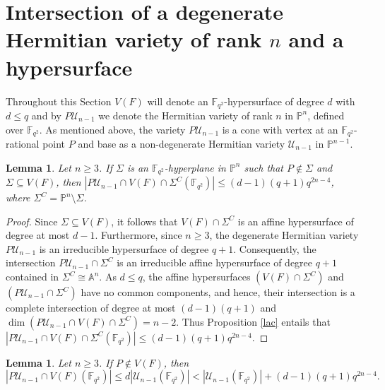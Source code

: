 \documentclass[10pt,a4paper,oneside]{amsproc}
\newtheorem{lemma}[theorem]{Lemma}
\newcommand{\Fqt}{\mathbb{F}_{q^2}}
\newcommand{\U}{\mathcal{U}}
\def\AA{{\mathbb A}}
\def\PP{{\mathbb P}}
\begin{document}
\section{Intersection of a degenerate Hermitian variety of rank $n$ and a hypersurface}\label{degenerate of rank n}
Throughout this Section $V(F)$ will denote an $\Fqt$-hypersurface of degree $d$ with $d\leq q$ and by $P\U_{n-1}$ we denote the Hermitian variety of rank $n$ in $\PP^n$, defined over $\Fqt$. As mentioned above, the variety $P\U_{n-1}$ is a cone with vertex at an $\Fqt$-rational point $P$ and base as a non-degenerate Hermitian variety $\U_{n-1}$ in $\PP^{n-1}$.
\begin{lemma}\label{outside hyperplane}
 Let $n\geq 3$. If $\Sigma$ is an $\Fqt$-hyperplane in $\PP^n$  such that $P \not\in \Sigma$ and $\Sigma \subseteq  V(F)$, then $|P\U_{n-1} \cap V(F)\cap \Sigma^C(\Fqt)| \le (d-1)(q+1)q^{2n-4}$, where $\Sigma^C = \PP^n \setminus \Sigma$. 
\end{lemma}

\begin{proof}
    Since $\Sigma \subseteq V(F)$, it follows that $V(F) \cap \Sigma^C$ is an affine hypersurface of degree at most $d-1$. Furthermore, since $n\geq 3$, the degenerate Hermitian variety $P\U_{n-1}$ is an irreducible hypersurface of degree $q+1$. Consequently, the intersection $P\U_{n-1} \cap \Sigma^C$ is an irreducible affine hypersurface of degree $q+1$ contained in $\Sigma^C\cong \AA^n$. As $d\leq q$, the affine hypersurfaces $\left(V\left(F\right) \cap \Sigma^C\right)$ and $\left(P\U_{n-1} \cap \Sigma^C\right)$ have no common components, and hence, their intersection is a complete intersection of degree at most $(d-1)(q+1)$ and $\dim \left(P\U_{n-1} \cap V\left(F\right) \cap \Sigma^C\right) = n-2$. Thus Proposition \ref{lac} entails that $|P\U_{n-1} \cap V(F) \cap \Sigma^C(\Fqt)| \le (d-1)(q+1)q^{2n-4}$.
\end{proof}

\begin{lemma}\label{missing P}
  Let $n\geq 3$. If $P\notin V(F)$, then $$|P\U_{n-1}\cap V(F)(\Fqt)|\leq d|\U_{n-1}(\Fqt)|< |\U_{n-1}(\Fqt)|+(d-1)(q+1)q^{2n-4}.$$   
\end{lemma}
\end{document}
